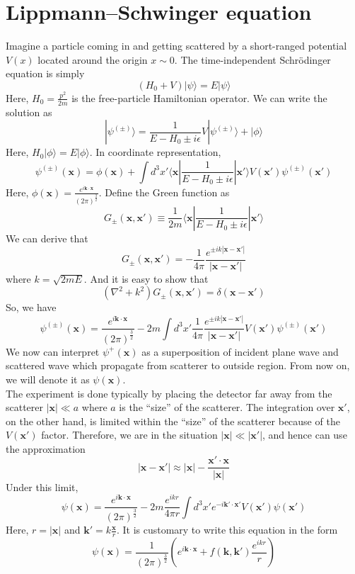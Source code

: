 \documentclass[cyan]{elegantnote}
\begin{document}
\section{Lippmann–Schwinger equation}
Imagine a particle coming in and getting scattered by a short-ranged potential $V(x)$ located around the origin $x \sim 0$. The time-independent Schr\"{o}dinger equation is simply
\[(H_0 + V)|\psi\rangle = E |\psi\rangle\]
Here, $H_0 = \frac{p^2}{2m}$ is the free-particle Hamiltonian operator. We can write the solution as
\[|\psi^{(\pm)}\rangle = \frac{1}{E-H_0 \pm i\epsilon}V|\psi^{(\pm)}\rangle + |\phi\rangle\]
Here, $H_0 |\phi\rangle = E |\phi\rangle$. In coordinate representation,
\[\psi^{(\pm)}(\mathbf{x}) = \phi(\mathbf{x}) + \int d^3x' \langle \bm{x} | \frac{1}{E-H_0 \pm i\epsilon} | \bm{x}' \rangle V(\bm{x}') \psi^{(\pm)}(\bm{x}')\]
Here, $\phi(\bm{x}) = \frac{e^{i\bm{k}\cdot\bm{x}}}{(2\pi)^{\frac{3}{2}}}$. Define the Green function as
\[G_{\pm}(\bm{x},\bm{x}') \equiv \frac{1}{2m} \langle \bm{x} | \frac{1}{E-H_0 \pm i\epsilon} | \bm{x}' \rangle\]
We can derive that
\[G_{\pm}(\bm{x},\bm{x}') = -\frac{1}{4\pi} \frac{e^{\pm ik|\bm{x}-\bm{x}'|}}{|\bm{x}-\bm{x}'|}\]
where $k = \sqrt{2mE}$. And it is easy to show that
\[(\nabla^2 + k^2)G_{\pm}(\bm{x},\bm{x}') = \delta(\bm{x}-\bm{x}')\]
So, we have
\[\psi^{(\pm)}(\bm{x}) = \frac{e^{i\bm{k}\cdot\bm{x}}}{(2\pi)^{\frac{3}{2}}} - 2m \int d^3x' \frac{1}{4\pi} \frac{e^{\pm ik|\bm{x}-\bm{x}'|}}{|\bm{x}-\bm{x}'|} V(\bm{x}') \psi^{(\pm)}(\bm{x}')\]
We now can interpret $\psi^{+}(\bm{x})$ as a superposition of incident plane wave and scattered wave which propagate from scatterer to outside region. From now on, we will denote it as $\psi(\bm{x})$.
\\
The experiment is done typically by placing the detector far away from the scatterer $|\bm{x}| \ll a$ where $a$ is the ``size'' of the scatterer. The integration over $\bm{x}'$, on the other hand, is limited within the ``size'' of the scatterer because of the $V(\bm{x}')$ factor. Therefore, we are in the situation $|\bm{x}| \ll |\bm{x}'|$, and hence can use the approximation
\[|\bm{x}-\bm{x}'| \approx |\bm{x}| - \frac{\bm{x}' \cdot \bm{x}}{|\bm{x}|}\]
Under this limit,
\[\psi(\bm{x}) = \frac{e^{i\bm{k}\cdot\bm{x}}}{(2\pi)^{\frac{3}{2}}} - 2m \frac{e^{ikr}}{4\pi r} \int d^3x' e^{-i\bm{k}' \cdot \bm{x}'} V(\bm{x}') \psi(\bm{x}')\]
Here, $r = |\bm{x}|$ and $\bm{k}' = k \frac{\bm{x}}{r}$. It is customary to write this equation in the form
\[\psi(\bm{x}) = \frac{1}{(2\pi)^{\frac{3}{2}}}\left( e^{i\bm{k}\cdot\bm{x}} +  f(\bm{k},\bm{k}') \frac{e^{ikr}}{r} \right) \]
\end{document}

